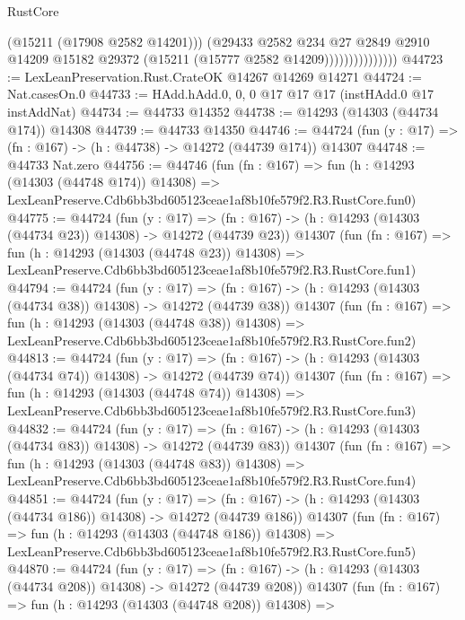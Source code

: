\begin{lexlean}{RustCore}
\begin{coremodule}
                              (@15211 (@17908 @2582 @14201)))
                            (@29433
                              @2582
                              @234
                              @27
                              @2849
                              @2910
                              @14209
                              @15182
                              @29372
                              (@15211 (@15777 @2582 @14209)))))))))))))))
@44723 := LexLeanPreservation.Rust.CrateOK @14267 @14269 @14271
@44724 := Nat.casesOn.{0}
@44733 := HAdd.hAdd.{0, 0, 0} @17 @17 @17 (instHAdd.{0} @17 instAddNat)
@44734 := @44733 @14352
@44738 := @14293 (@14303 (@44734 @174)) @14308
@44739 := @44733 @14350
@44746 := @44724 (fun (y : @17) => (fn : @167) -> (h : @44738) -> @14272 (@44739 @174)) @14307
@44748 := @44733 Nat.zero
@44756 := @44746
    (fun (fn : @167) =>
    fun (h : @14293 (@14303 (@44748 @174)) @14308) =>
    LexLeanPreserve.Cdb6bb3bd605123ceae1af8b10fe579f2.R3.RustCore.fun0)
@44775 := @44724
    (fun (y : @17) =>
    (fn : @167) -> (h : @14293 (@14303 (@44734 @23)) @14308) -> @14272 (@44739 @23))
    @14307
    (fun (fn : @167) =>
    fun (h : @14293 (@14303 (@44748 @23)) @14308) =>
    LexLeanPreserve.Cdb6bb3bd605123ceae1af8b10fe579f2.R3.RustCore.fun1)
@44794 := @44724
    (fun (y : @17) =>
    (fn : @167) -> (h : @14293 (@14303 (@44734 @38)) @14308) -> @14272 (@44739 @38))
    @14307
    (fun (fn : @167) =>
    fun (h : @14293 (@14303 (@44748 @38)) @14308) =>
    LexLeanPreserve.Cdb6bb3bd605123ceae1af8b10fe579f2.R3.RustCore.fun2)
@44813 := @44724
    (fun (y : @17) =>
    (fn : @167) -> (h : @14293 (@14303 (@44734 @74)) @14308) -> @14272 (@44739 @74))
    @14307
    (fun (fn : @167) =>
    fun (h : @14293 (@14303 (@44748 @74)) @14308) =>
    LexLeanPreserve.Cdb6bb3bd605123ceae1af8b10fe579f2.R3.RustCore.fun3)
@44832 := @44724
    (fun (y : @17) =>
    (fn : @167) -> (h : @14293 (@14303 (@44734 @83)) @14308) -> @14272 (@44739 @83))
    @14307
    (fun (fn : @167) =>
    fun (h : @14293 (@14303 (@44748 @83)) @14308) =>
    LexLeanPreserve.Cdb6bb3bd605123ceae1af8b10fe579f2.R3.RustCore.fun4)
@44851 := @44724
    (fun (y : @17) =>
    (fn : @167) -> (h : @14293 (@14303 (@44734 @186)) @14308) -> @14272 (@44739 @186))
    @14307
    (fun (fn : @167) =>
    fun (h : @14293 (@14303 (@44748 @186)) @14308) =>
    LexLeanPreserve.Cdb6bb3bd605123ceae1af8b10fe579f2.R3.RustCore.fun5)
@44870 := @44724
    (fun (y : @17) =>
    (fn : @167) -> (h : @14293 (@14303 (@44734 @208)) @14308) -> @14272 (@44739 @208))
    @14307
    (fun (fn : @167) =>
    fun (h : @14293 (@14303 (@44748 @208)) @14308) =>

\end{coremodule}
\end{lexlean}
